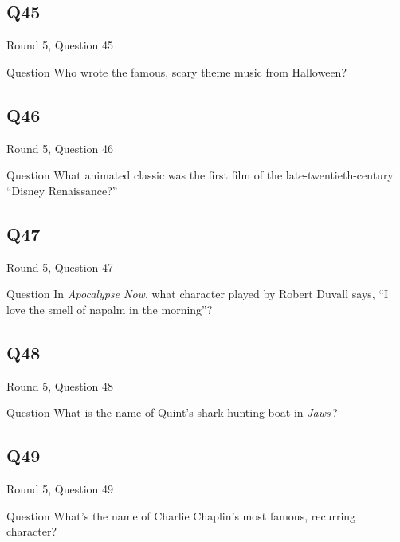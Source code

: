 \documentclass[11pt]{beamer}
\begin{document}
\subsection*{Q45}
\begin{frame}[t]{Round 5, Question 45}
\vspace{2em}
\begin{block}{Question}
Who wrote the famous, scary theme music from Halloween?
\end{block}
\end{frame}
    

\subsection*{Q46}
\begin{frame}[t]{Round 5, Question 46}
\vspace{2em}
\begin{block}{Question}
What animated classic was the first film of the late-twentieth-century ``Disney Renaissance?''
\end{block}
\end{frame}
    

\subsection*{Q47}
\begin{frame}[t]{Round 5, Question 47}
\vspace{2em}
\begin{block}{Question}
In \emph{Apocalypse Now}, what character played by Robert Duvall says, ``I love the smell of napalm in the morning''?
\end{block}
\end{frame}
    

\subsection*{Q48}
\begin{frame}[t]{Round 5, Question 48}
\vspace{2em}
\begin{block}{Question}
What is the name of Quint's shark-hunting boat in \emph{Jaws}\,?
\end{block}
\end{frame}
    

\subsection*{Q49}
\begin{frame}[t]{Round 5, Question 49}
\vspace{2em}
\begin{block}{Question}
What's the name of Charlie Chaplin's most famous, recurring character?
\end{block}
\end{frame}
    
\end{document}
